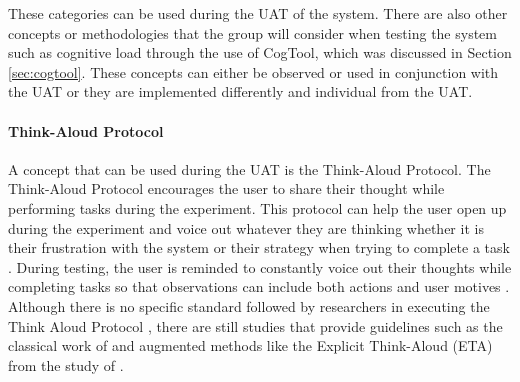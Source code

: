         These categories can be used during the UAT of the system. There are also other concepts or methodologies that the group will consider when testing the system such as cognitive load through the use of CogTool, which was discussed in Section \ref{sec:cogtool}. These concepts can either be observed or used in conjunction with the UAT or they are implemented differently and individual from the UAT.
        
        	\paragraph{Think-Aloud Protocol}
            
            A concept that can be used during the UAT is the Think-Aloud Protocol. The Think-Aloud Protocol encourages the user to share their thought while performing tasks during the experiment. This protocol can help the user open up during the experiment and voice out whatever they are thinking whether it is their frustration with the system or their strategy when trying to complete a task \citep{gomoll1996some}. During testing, the user is reminded to constantly voice out their thoughts while completing tasks so that observations can include both actions and user motives \citep{gomoll1996some}. Although there is no specific standard followed by researchers in executing the Think Aloud Protocol \citep{mcdonald2013the,gill2012think}, there are still studies that provide guidelines such as the classical work of \citet{ericsson1998study} and augmented methods like the Explicit Think-Aloud (ETA) from the study of \citet{mcdonald2013the}.
            
            

